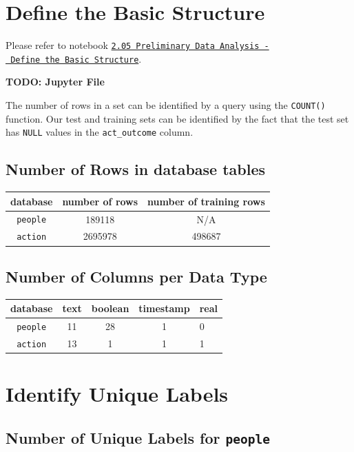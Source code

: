 \documentclass[]{report}
\begin{document}
\pagebreak 

\chapter{Define the Basic Structure}\label{define-the-basic-structure}

Please refer to notebook
\href{http://joshuacook.me:8003/notebooks/ipynb/2.01\%20Preliminary\%20Data\%20Analysis\%20-\%20Define\%20the\%20Basic\%20Structure.ipynb}{\texttt{2.05\ Preliminary\ Data\ Analysis\ -\ Define\ the\ Basic\ Structure}}.

\textbf{TODO: Jupyter File}

The number of rows in a set can be identified by a query using the
\texttt{COUNT()} function. Our test and training sets can be identified
by the fact that the test set has \texttt{NULL} values in the
\texttt{act\_outcome} column.

\section{Number of Rows in database
tables}\label{number-of-rows-in-database-tables}

\begin{longtable}[]{@{}ccc@{}}
\toprule
database & number of rows & number of training rows\tabularnewline
\midrule
\endhead
\texttt{people} & 189118 & N/A\tabularnewline
\texttt{action} & 2695978 & 498687\tabularnewline
\bottomrule
\end{longtable}

\section{Number of Columns per Data
Type}\label{number-of-columns-per-data-type}

\begin{longtable}[]{@{}ccccl@{}}
\toprule
database & text & boolean & timestamp & real\tabularnewline
\midrule
\endhead
\texttt{people} & 11 & 28 & 1 & 0\tabularnewline
\texttt{action} & 13 & 1 & 1 & 1\tabularnewline
\bottomrule
\end{longtable}

\chapter{Identify Unique Labels}\label{identify-unique-labels}

\section{\texorpdfstring{Number of Unique Labels for
\texttt{people}}{Number of Unique Labels for people}}\label{number-of-unique-labels-for-people}
\end{document}
